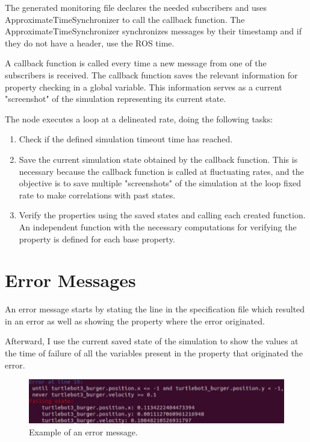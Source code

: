 
The generated monitoring file declares the needed subscribers and uses ApproximateTimeSynchronizer to call the callback function. The ApproximateTimeSynchronizer synchronizes messages by their timestamp and if they do not have a header, use the ROS time.

A callback function is called every time a new message from one of the subscribers is received. The callback function saves the relevant information for property checking in a global variable. This information serves as a current "screenshot" of the simulation representing its current state.

The node executes a loop at a delineated rate, doing the following tasks:

\begin{enumerate}
    \item Check if the defined simulation timeout time has reached.
    \item Save the current simulation state obtained by the callback function. This is necessary because the callback function is called at fluctuating rates, and the objective is to save multiple "screenshots" of the simulation at the loop fixed rate to make correlations with past states.
    \item Verify the properties using the saved states and calling each created function. An independent function with the necessary computations for verifying the property is defined for each base property.
\end{enumerate}


\section{Error Messages}
\label{sec:errormessages}

An error message starts by stating the line in the specification file which resulted in an error as well as showing the property where the error originated.

Afterward, I use the current saved state of the simulation to show the values at the time of failure of all the variables present in the property that originated the error.

\begin{figure}[htb]
\includegraphics[width=\textwidth]{images/error_message1.png}
\caption{Example of an error message.} \label{fig:monerror}
\end{figure}